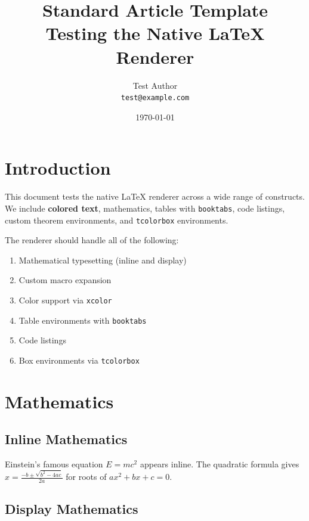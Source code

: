\documentclass[12pt,a4paper]{article}
\title{\textbf{Standard Article Template}\\
  \large Testing the Native \LaTeX{} Renderer}
\author{Test Author \\ \texttt{test@example.com}}
\date{\today}
\newcommand{\highlight}[1]{\textcolor{blue!70!black}{\textbf{#1}}}
\begin{document}
\maketitle
\tableofcontents
\newpage

\section{Introduction}
\label{sec:intro}

This document tests the native \LaTeX{} renderer across a wide range of constructs.
We include \highlight{colored text}, mathematics, tables with \texttt{booktabs},
code listings, custom theorem environments, and \texttt{tcolorbox} environments.

The renderer should handle all of the following:
\begin{enumerate}[label=\Roman*.]
  \item Mathematical typesetting (inline and display)
  \item Custom macro expansion
  \item Color support via \texttt{xcolor}
  \item Table environments with \texttt{booktabs}
  \item Code listings
  \item Box environments via \texttt{tcolorbox}
\end{enumerate}

\section{Mathematics}
\label{sec:math}

\subsection{Inline Mathematics}

Einstein's famous equation $E = mc^2$ appears inline. The quadratic formula gives
$x = \frac{-b \pm \sqrt{b^2 - 4ac}}{2a}$ for roots of $ax^2 + bx + c = 0$.

\subsection{Display Mathematics}
\end{document}
